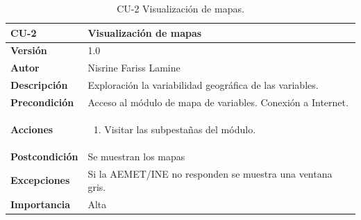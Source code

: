 \begin{table}[p]
	\centering
	\begin{tabularx}{\linewidth}{ p{} p{} }
		\toprule
		\textbf{CU-2}    & \textbf{Visualización de mapas}\\
		\toprule
		\textbf{Versión}              & 1.0    \\
		\textbf{Autor}                & Nisrine Fariss Lamine \\
		
		\textbf{Descripción}          & Exploración la variabilidad geográfica de las variables. \\
		\textbf{Precondición}         & Acceso al módulo de mapa de variables. Conexión a Internet. \\
		\textbf{Acciones}             &
		\begin{enumerate}
			\def\labelenumi{\arabic{enumi}.}
			\tightlist
			\item Visitar las subpestañas del módulo.
			
		\end{enumerate}\\
		\textbf{Postcondición}        & Se muestran los mapas \\
		\textbf{Excepciones}          & Si la AEMET/INE no responden se muestra una ventana gris. \\
		\textbf{Importancia}          & Alta \\
		\bottomrule
	\end{tabularx}
	\caption{CU-2 Visualización de mapas.}
\end{table}


